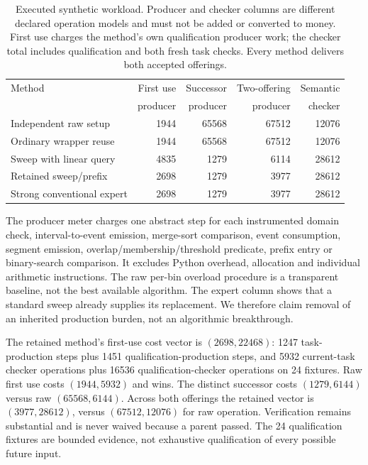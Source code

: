 \documentclass[11pt,letterpaper]{article}
\begin{document}
\begin{table}[htbp]
\centering\small
\begin{tabularx}{\linewidth}{@{}Yrrrr@{}}
\toprule
Method & First use & Successor & Two-offering & Semantic\\
& producer & producer & producer & checker\\
\midrule
Independent raw setup & 1944 & 65568 & 67512 & 12076\\
Ordinary wrapper reuse & 1944 & 65568 & 67512 & 12076\\
Sweep with linear query & 4835 & 1279 & 6114 & 28612\\
Retained sweep/prefix & 2698 & 1279 & 3977 & 28612\\
Strong conventional expert & 2698 & 1279 & 3977 & 28612\\
\bottomrule
\end{tabularx}
\caption{Executed synthetic workload. Producer and checker columns are different declared operation models and must not be added or converted to money. First use charges the method's own qualification producer work; the checker total includes qualification and both fresh task checks. Every method delivers both accepted offerings.}
\label{tab:instrument-results}
\end{table}

The producer meter charges one abstract step for each instrumented domain check, interval-to-event emission, merge-sort comparison, event consumption, segment emission, overlap/membership/threshold predicate, prefix entry or binary-search comparison. It excludes Python overhead, allocation and individual arithmetic instructions. The raw per-bin overload procedure is a transparent baseline, not the best available algorithm. The expert column shows that a standard sweep already supplies its replacement. We therefore claim removal of an inherited production burden, not an algorithmic breakthrough.

The retained method's first-use cost vector is $(2698,22468)$: 1247 task-production steps plus 1451 qualification-production steps, and 5932 current-task checker operations plus 16536 qualification-checker operations on 24 fixtures. Raw first use costs $(1944,5932)$ and wins. The distinct successor costs $(1279,6144)$ versus raw $(65568,6144)$. Across both offerings the retained vector is $(3977,28612)$, versus $(67512,12076)$ for raw operation. Verification remains substantial and is never waived because a parent passed. The 24 qualification fixtures are bounded evidence, not exhaustive qualification of every possible future input.
\end{document}
